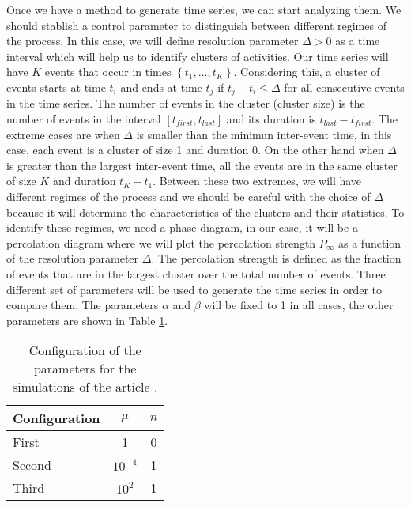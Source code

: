 Once we have a method to generate time series, we can start analyzing them. We should stablish a control parameter to distinguish between different regimes of the process. In this case,
we will define resolution parameter $\Delta >0$ as a time interval which will help us to identify clusters of activities. Our time series will have $K$ events that occur in times 
$\left\{ t_1,\ldots, t_K \right\}$. Considering this, a cluster of events starts at time $t_i$ and ends at time $t_j$ if $t_j-t_i\leq \Delta$ for all consecutive events in the time series. 
The number of events in the cluster (cluster size) is the number of events in the interval $[t_{first},t_{last}]$ and its duration is $t_{last}-t_{first}$. 
The extreme cases are when $\Delta$ is smaller than the minimun inter-event time, in this case,
each event is a cluster of size 1 and duration 0. On the other hand when $\Delta$ is greater than the largest inter-event time, all the events are in the same cluster of size $K$ and
duration $t_K-t_1$. Between these two extremes, we will have different regimes of the process and we should be careful with the choice of $\Delta$ because it will determine the
characteristics of the clusters and their statistics. To identify these regimes, we need a phase diagram, in our case, it will be a percolation 
diagram where we will plot the percolation strength $P_{\infty}$ as a function of the resolution parameter $\Delta$. The percolation strength is defined as the fraction of events that are
in the largest cluster over the total number of events. Three different set of parameters will be used to generate the time series in order to compare them. The parameters $\alpha$ and 
$\beta$ will be fixed to 1 in all cases, the other parameters are shown in Table \ref{tab: parameters}.

\begin{table}[H]
    \centering
    \caption{Configuration of the parameters for the simulations of the article \cite{notarmuzi2021percolation}.}
    \label{tab: parameters}
    \begin{tabular}{@{}lcc@{}}
    \toprule
    Configuration & \multicolumn{1}{c}{$\mu$} & \multicolumn{1}{c}{$n$} \\ \midrule
    First & 1 & 0 \\
    Second & $10^{-4}$ & 1 \\
    Third & $10^2$ & 1 \\ \bottomrule
    \end{tabular}
\end{table}

